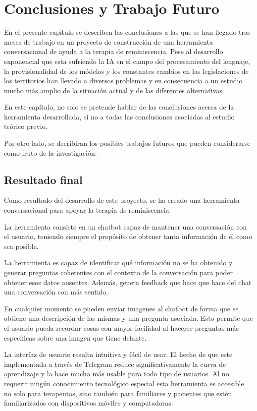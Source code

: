 \chapter{Conclusiones y Trabajo Futuro}
\label{cap:conclusiones}
En el presente capítulo se describen las conclusiones a las que se han llegado tras meses de trabajo en un proyecto de construcción de una herramienta conversacional de ayuda a la terapia de reminiscencia. Pese al desarrollo exponencial que esta sufriendo la IA en el campo del procesamiento del lenguaje, la provisionalidad de los módelos y los constantes cambios en las legislaciones de los territorios han llevado a diversos problemas y en consecuencia a un estudio mucho más amplio de la situación actual y de las diferentes alternativas. 

En este capítulo, no solo se pretende hablar de las conclusiones acerca de la herramienta desarrollada, si no a todas las conclusiones asociadas al estudio teórico previo. 

Por otro lado, se decribiran los posibles trabajos futuros que pueden considerarse como fruto de la investigación.


\section{Resultado final}
Como resultado del desarrollo de este proyecto, se ha creado una herramienta conversacional para apoyar la terapia de reminiscencia. 

La herramienta consiste en un chatbot capaz de mantener una conversación con el usuario, teniendo siempre el propósito de obtener tanta información de él como sea posible. 

La  herramienta es capaz de identificar qué información no se ha obtenido y generar preguntas coherentes con el contexto de la conversación para poder obtener esos datos ausentes. Además, genera feedback que hace que hace del chat una conversación con más sentido. 

En cualquier momento se pueden enviar imagenes al chatbot de forma que se obtiene una descripción de las mismas y una pregunta asociada. Esto permite que el usuario pueda recordar cosas con mayor facilidad al hacerse preguntas más específicas sobre una imagen que tiene delante. 

La interfaz de usuario resulta intuitiva y fácil de usar. El hecho de que este implementada a través de Telegram reduce significativamente la curva de aprendizaje y la hace mucho más usable para todo tipo de usuarios. Al no requerir ningún conocimiento tecnológico especial esta herramienta es accesible no solo para terapeutas, sino también para familiares y pacientes que estén familiarizados con dispositivos móviles y computadoras.

